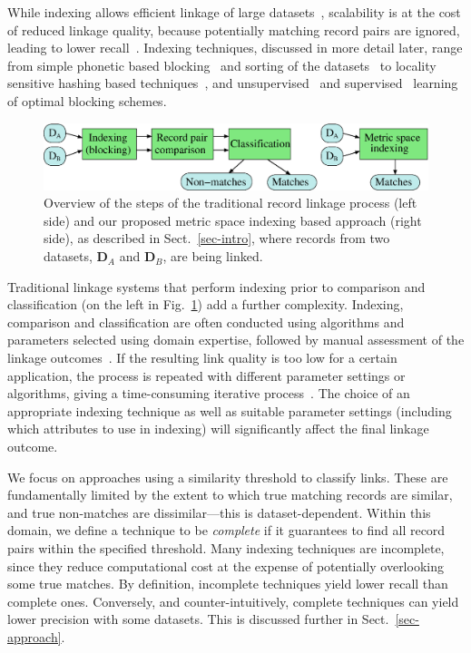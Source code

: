 \documentclass{llncs}
\begin{document}
While indexing allows efficient linkage of large datasets~\cite{Don15},
scalability is at the cost of reduced linkage quality, because
potentially matching record pairs are ignored, leading to lower
recall~\cite{Chr12}. Indexing techniques, discussed in more detail
later, range from simple phonetic based blocking~\cite{Chr12} and
sorting of the datasets~\cite{Dra12} to locality sensitive hashing based
techniques~\cite{Kim10,Steorts2014}, and unsupervised~\cite{Kej13,Ram15}
and supervised~\cite{Bil06,Mic06} learning of optimal blocking schemes.



\begin{figure}[!t]
  \centering
  \includegraphics[width=1.0\textwidth]{figures/linkage-process}
  \caption{Overview of the steps of the traditional record linkage
           process (left side) and our proposed metric space
           indexing based approach (right side), as described in
           Sect.~\ref{sec-intro}, where records from two datasets,
           $\mathbf{D}_A$ and $\mathbf{D}_B$, are being linked.}
           \label{fig-rl-process}
\end{figure}


Traditional linkage systems that perform indexing prior to comparison
and classification (on the left in Fig.~\ref{fig-rl-process}) add a
further complexity. Indexing, comparison and classification are often
conducted using algorithms and parameters selected using domain
expertise, followed by manual assessment of the linkage
outcomes~\cite{Chr12}. If the resulting link quality is too low for a
certain application, the process is repeated with different parameter
settings or algorithms, giving a time-consuming iterative
process~\cite{Fis15}. The choice of an appropriate indexing technique
as well as suitable parameter settings (including which attributes to
use in indexing) will significantly affect the final linkage outcome.

We focus on approaches using a similarity threshold to classify links.
These are fundamentally limited by the extent to which true matching
records are similar, and true non-matches are dissimilar---this is
dataset-dependent. Within this domain, we define a technique to be
\emph{complete} if it guarantees to find all record pairs within the
specified threshold. Many indexing techniques are incomplete, since they
reduce computational cost at the expense of potentially overlooking some
true matches. By definition, incomplete techniques yield lower recall
than complete ones. Conversely, and counter-intuitively, complete
techniques can yield lower precision with some datasets. This is
discussed further in Sect.~\ref{sec-approach}.
\end{document}
